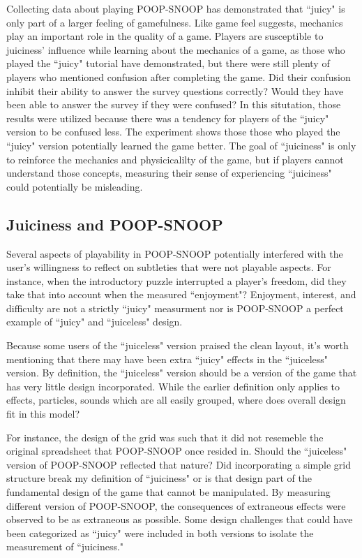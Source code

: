 Collecting data about playing POOP-SNOOP has demonstrated that ``juicy" is only part of a larger feeling of gamefulness. Like game feel suggests, mechanics play an important role in the quality of a game. Players are susceptible to juiciness' influence while learning about the mechanics of a game, as those who played the ``juicy" tutorial have demonstrated, but there were still plenty of players who mentioned confusion after completing the game. Did their confusion inhibit their ability to answer the survey questions correctly? Would they have been able to answer the survey if they were confused? In this situtation, those results were utilized because there was a tendency for players of the ``juicy" version to be confused less. The experiment shows those those who played the ``juicy" version potentially learned the game better. The goal of ``juiciness" is only to reinforce the mechanics and physicicalilty of the game, but if players cannot understand those concepts, measuring their sense of experiencing ``juiciness" could potentially be misleading.

\subsection{Juiciness and POOP-SNOOP}

Several aspects of playability in POOP-SNOOP potentially interfered with the user's willingness to reflect on subtleties that were not playable aspects. For instance, when the introductory puzzle interrupted a player's freedom, did they take that into account when the measured ``enjoyment"? Enjoyment, interest, and difficulty are not a strictly ``juicy" measurment nor is POOP-SNOOP a perfect example of ``juicy" and ``juiceless" design.

Because some users of the ``juiceless" version praised the clean layout, it's worth mentioning that there may have been extra ``juicy" effects in the ``juiceless" version. By definition, the ``juiceless" version should be a version of the game that has very little design incorporated. While the earlier definition only applies to effects, particles, sounds which are all easily grouped, where does overall design fit in this model?

For instance, the design of the grid was such that it did not resemeble the original spreadsheet that POOP-SNOOP once resided in. Should the ``juiceless" version of POOP-SNOOP reflected that nature? Did incorporating a simple grid structure break my definition of ``juiciness" or is that design part of the fundamental design of the game that cannot be manipulated. By measuring different version of POOP-SNOOP, the consequences of extraneous effects were observed to be as extraneous as possible. Some design challenges that could have been categorized as ``juicy" were included in both versions to isolate the measurement of ``juiciness."

